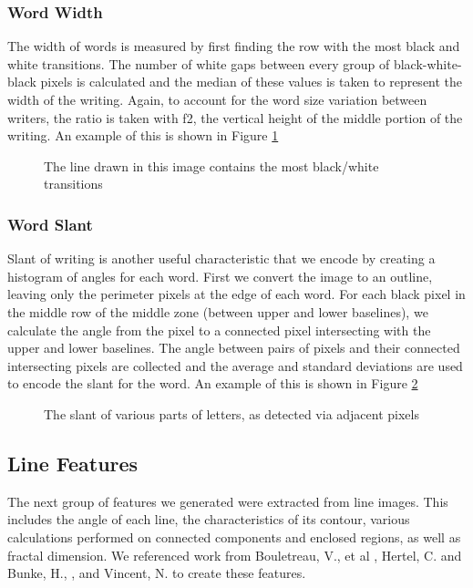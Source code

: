 \documentclass[paper=a4, fontsize=11pt]{scrartcl} %
\numberwithin{equation}{section} %
\numberwithin{figure}{section} %
\numberwithin{table}{section} %
\begin{document}
\subsubsection{Word Width}
The width of words is measured by first finding the row with the most
black and white transitions. The number of white gaps between every
group of black-white-black pixels is calculated and the median of
these values is taken to represent the width of the writing. Again, to
account for the word size variation between writers, the ratio is
taken with f2, the vertical height of the middle portion of the
writing. An example of this is shown in Figure \ref{fig:wordwidth}

\begin{figure}
  \caption{The line drawn in this image contains the most black/white
    transitions}
  \label{fig:wordwidth}
\end{figure}

\subsubsection{Word Slant}
Slant of writing is another useful characteristic that we encode by
creating a histogram of angles for each word. First we convert the
image to an outline, leaving only the perimeter pixels at the edge of
each word. For each black pixel in the middle row of the middle zone
(between upper and lower baselines), we calculate the angle from the
pixel to a connected pixel intersecting with the upper and lower
baselines. The angle between pairs of pixels and their connected
intersecting pixels are collected and the average and standard
deviations are used to encode the slant for the word. An example of
this is shown in Figure \ref{fig:wordslant}

\begin{figure}
  \label{fig:wordslant}
  \caption{The slant of various parts of letters, as detected via
    adjacent pixels}
\end{figure}


\subsection{Line Features}
The next group of features we generated were extracted from line
images. This includes the angle of each line, the characteristics of
its contour, various calculations performed on connected components
and enclosed regions, as well as fractal dimension. We referenced work
from Bouletreau, V., et al \cite{SyntheticParameters}, Hertel, C. and
Bunke, H., \cite{NovelFeatures}, and Vincent,
N. \cite{FractalDimensions} to create these features.
\end{document}
